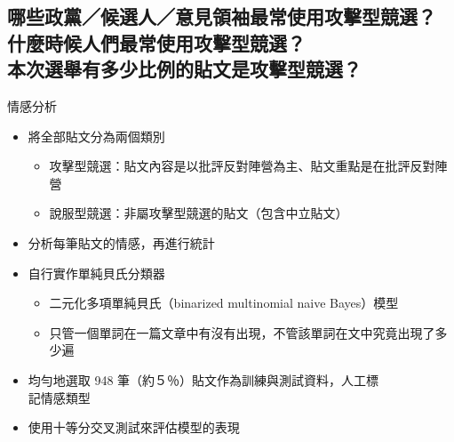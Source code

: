 \documentclass{beamer}
\begin{document}
\begin{CJK}{UTF8}{bkai}
\section{
哪些政黨／候選人／意見領袖最常使用攻擊型競選？\texorpdfstring{\protect\\}{}
\hspace{.35em}什麼時候人們最常使用攻擊型競選？\texorpdfstring{\protect\\}{}
\hspace{.35em}本次選舉有多少比例的貼文是攻擊型競選？
}

\begin{frame}{情感分析}
\begin{itemize}
\item 將全部貼文分為兩個類別
  \begin{itemize}
  \item 攻擊型競選：貼文內容是以批評反對陣營為主、貼文重點是在批評反對陣營
  \item 說服型競選：非屬攻擊型競選的貼文（包含中立貼文）
  \end{itemize}
\item 分析每筆貼文的情感，再進行統計
\item 自行實作單純貝氏分類器
  \begin{itemize}
  \item 二元化多項單純貝氏（binarized multinomial naive Bayes）模型
  \item 只管一個單詞在一篇文章中有沒有出現，不管該單詞在文中究竟出現了多少遍
  \end{itemize}
\item 均勻地選取 948 筆（約５％）貼文作為訓練與測試資料，人工標\\記情感類型
\item 使用十等分交叉測試來評估模型的表現
\end{itemize}
\end{frame}


\end{CJK}
\end{document}
